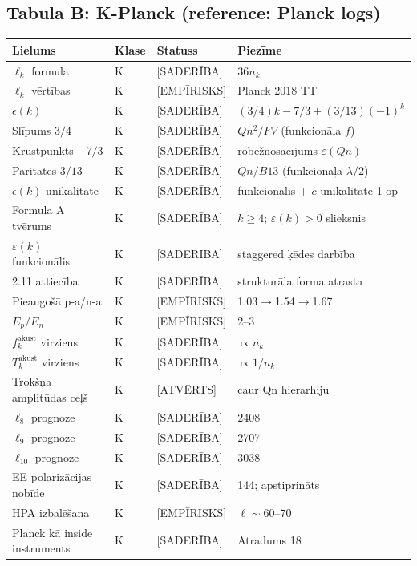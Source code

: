\documentclass[12pt,a4paper]{article}
\begin{document}
\subsection*{Tabula B: K-Planck (reference: Planck logs)}

\begin{longtable}{|l|l|l|l|}
\hline
\textbf{Lielums} & \textbf{Klase} & \textbf{Statuss} & \textbf{Piezīme} \\
\hline
\endhead
$\ell_k$ formula & K & [SADERĪBA] & $36n_k$ \\
$\ell_k$ vērtības & K & [EMPĪRISKS] & Planck 2018 TT \\
$\epsilon(k)$ & K & [SADERĪBA] & $(3/4)k-7/3+(3/13)(-1)^k$ \\
Slīpums $3/4$ & K & [SADERĪBA] & $Qn^2/FV$ (funkcionāļa $f$) \\
Krustpunkts $-7/3$ & K & [SADERĪBA] & robežnosacījums $\varepsilon(Qn)$ \\
Paritātes $3/13$ & K & [SADERĪBA] & $Qn/B13$ (funkcionāļa $\lambda/2$) \\
$\epsilon(k)$ unikalitāte & K & [SADERĪBA] & funkcionālis + $c$ unikalitāte 1-op \\
Formula A tvērums & K & [SADERĪBA] & $k\geq 4$; $\varepsilon(k) > 0$ slieksnis \\
$\varepsilon(k)$ funkcionālis & K & [SADERĪBA] & staggered ķēdes darbība \\
\hline
2.11 attiecība & K & [SADERĪBA] & strukturāla forma atrasta \\
Pieaugošā p-a/n-a & K & [EMPĪRISKS] & 1.03$\to$1.54$\to$1.67 \\
$E_p/E_n$ & K & [EMPĪRISKS] & 2--3 \\
$f_k^{\text{akust}}$ virziens & K & [SADERĪBA] & $\propto n_k$ \\
$T_k^{\text{akust}}$ virziens & K & [SADERĪBA] & $\propto 1/n_k$ \\
Trokšņa amplitūdas ceļš & K & [ATVĒRTS] & caur Qn hierarhiju \\
\hline
$\ell_8$ prognoze & K & [SADERĪBA] & 2408 \\
$\ell_9$ prognoze & K & [SADERĪBA] & 2707 \\
$\ell_{10}$ prognoze & K & [SADERĪBA] & 3038 \\
EE polarizācijas nobīde & K & [SADERĪBA] & 144; apstiprināts \\
HPA izbalēšana & K & [EMPĪRISKS] & $\ell\sim 60$--$70$ \\
Planck kā inside instruments & K & [SADERĪBA] & Atradums 18 \\
\hline
\end{longtable}
\end{document}
